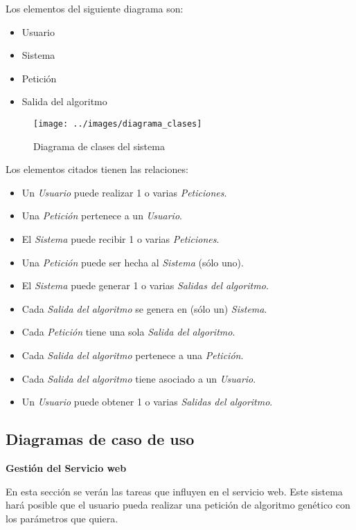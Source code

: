 Los elementos del siguiente diagrama son:

\begin{itemize}
	\item Usuario
	\item Sistema
	\item Petición
	\item Salida del algoritmo
\end{itemize}


\bigskip
\begin{figure}[h]
	\centering
	\texttt{[image: ../images/diagrama\_clases]}
	\caption[Diagrama de clases del sistema]{Diagrama de clases del sistema}
	\label{fig:diagrama_clases}
\end{figure}

\bigskip
Los elementos citados tienen las relaciones:

\begin{itemize}
	\item Un \textit{Usuario} puede realizar 1 o varias \textit{Peticiones}.
	\item Una \textit{Petición} pertenece a un \textit{Usuario}.
	\item El \textit{Sistema} puede recibir 1 o varias \textit{Peticiones}.
	\item Una \textit{Petición} puede ser hecha al \textit{Sistema} (sólo uno).
	\item El \textit{Sistema} puede generar 1 o varias \textit{Salidas del algoritmo}.
	\item Cada \textit{Salida del algoritmo} se genera en (sólo un) \textit{Sistema}.
	\item Cada \textit{Petición} tiene una sola \textit{Salida del algoritmo}.
	\item Cada \textit{Salida del algoritmo} pertenece a una \textit{Petición}. 
	\item Cada \textit{Salida del algoritmo} tiene asociado a un \textit{Usuario}.
	\item Un \textit{Usuario} puede obtener 1 o varias \textit{Salidas del algoritmo}.
\end{itemize}


\bigskip
\subsection{Diagramas de caso de uso}
\bigskip

\bigskip
\textbf{Gestión del Servicio web}

\bigskip
En esta sección se verán las tareas que influyen en el servicio web. Este sistema hará posible que el usuario pueda realizar una petición de algoritmo genético con los parámetros que quiera.


